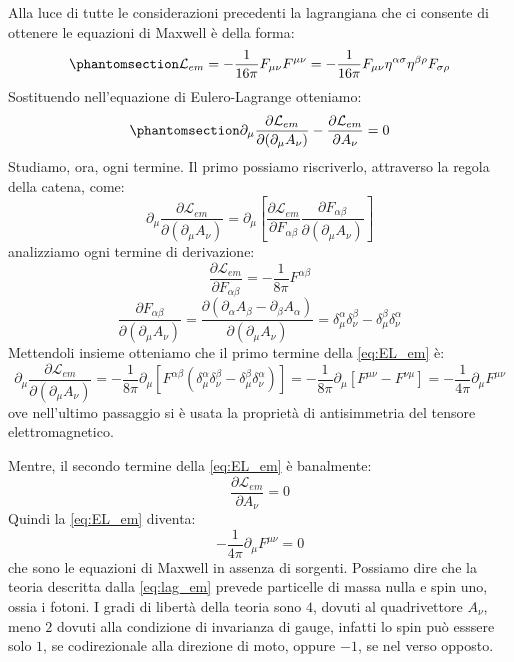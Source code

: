Alla luce di tutte le considerazioni precedenti la lagrangiana che ci consente di ottenere le equazioni di Maxwell è della forma:
\begin{equation}\phantomsection\label{eq:lag_em}
    \mathcal{L}_{em}=-\dfrac{1}{16\pi} F_{\mu\nu}F^{\mu\nu}=-\dfrac{1}{16\pi} F_{\mu\nu}\eta^{\alpha\sigma}\eta^{\beta\rho}F_{\sigma\rho}
\end{equation}
Sostituendo nell'equazione di Eulero-Lagrange otteniamo:
\begin{equation}\phantomsection\label{eq:EL_em}
    \partial_\mu\dfrac{\partial \mathcal{L}_{em}}{\partial(\partial_\mu A_\nu)}-\dfrac{\partial\mathcal{L}_{em}}{\partial A_\nu}=0 
\end{equation}
Studiamo, ora, ogni termine. Il primo possiamo riscriverlo, attraverso la regola della catena, come:
\begin{equation}
    \partial_\mu\dfrac{\partial \mathcal{L}_{em}}{\partial(\partial_\mu A_\nu)}=  \partial_\mu\left[\dfrac{\partial \mathcal{L}_{em}}{\partial F_{\alpha\beta}}\dfrac{\partial F_{\alpha\beta}}{\partial(\partial_\mu A_\nu)}\right]
\end{equation}
analizziamo ogni termine di derivazione:
\begin{equation}
    \dfrac{\partial \mathcal{L}_{em}}{\partial F_{\alpha\beta}}=-\dfrac{1}{8\pi} F^{\alpha\beta}
\end{equation}
\begin{equation}
   \dfrac{\partial F_{\alpha\beta}}{\partial(\partial_\mu A_\nu)}= \dfrac{\partial (\partial_\alpha A_\beta-\partial_\beta A_\alpha)}{\partial(\partial_\mu A_\nu)}=\delta^\alpha_\mu \delta^\beta_\nu-\delta^\beta_\mu \delta^\alpha_\nu
\end{equation}
Mettendoli insieme otteniamo che il primo termine della \eqref{eq:EL_em} è:
\begin{equation}
    \partial_\mu\dfrac{\partial \mathcal{L}_{em}}{\partial(\partial_\mu A_\nu)}= -\dfrac{1}{8\pi} \partial_\mu\left[   F^{\alpha\beta}  (\delta^\alpha_\mu \delta^\beta_\nu-\delta^\beta_\mu \delta^\alpha_\nu)  \right]= -\dfrac{1}{8\pi} \partial_\mu\left[   F^{\mu\nu}   - F^{\nu\mu}\right]=-\dfrac{1}{4\pi} \partial_\mu   F^{\mu\nu}
\end{equation}
ove nell'ultimo passaggio si è usata la proprietà di antisimmetria del tensore elettromagnetico.

Mentre, il secondo termine della \eqref{eq:EL_em} è banalmente:
\begin{equation}
 \dfrac{\partial\mathcal{L}_{em}}{\partial A_\nu}=0 
\end{equation}
Quindi la \eqref{eq:EL_em} diventa:
\begin{equation}
 -\dfrac{1}{4\pi} \partial_\mu   F^{\mu\nu}=0 
\end{equation}
che sono le equazioni di Maxwell in assenza di sorgenti.
Possiamo dire che la teoria descritta dalla \eqref{eq:lag_em} prevede particelle di massa nulla e spin uno, ossia i fotoni. I gradi di libertà della teoria sono $4$, dovuti al quadrivettore $A_\nu$, meno $2$ dovuti alla condizione di invarianza di gauge, infatti lo spin può esssere solo $1$, se codirezionale alla direzione di moto, oppure $-1$, se nel verso opposto.


